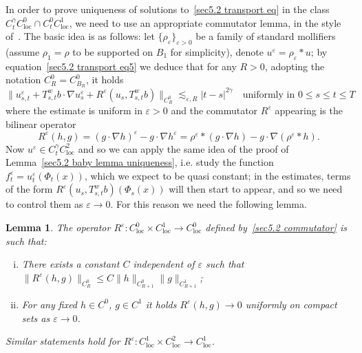 \documentclass[10pt]{article}
\newcommand{\tmop}[1]{\ensuremath{\operatorname{#1}}}
\newenvironment{enumerateroman}{\begin{enumerate}[i.] }{\end{enumerate}}
\newtheorem{lemma}{Lemma}
\begin{document}
In order to prove uniqueness of solutions to~{\eqref{sec5.2 transport eq}} in
the class $C^{\gamma}_t C^0_{\tmop{loc}} \cap C^0_t C^1_{\tmop{loc}}$, we need
to use an appropriate commutator lemma, in the style of~{\cite{diperna}}. The
basic idea is as follows: let $\{ \rho_{\varepsilon} \}_{\varepsilon > 0}$ be
a family of standard mollifiers (assume $\rho^{}_1 = \rho$ to be supported on
$B_1$ for simplicity), denote $u^{\varepsilon} = \rho_{\varepsilon} \ast u$;
by equation~{\eqref{sec5.2 transport eq5}} we deduce that for any $R > 0$,
adopting the notation $C^0_R = C^0_{B_R}$, it holds
\[ \| u^{\varepsilon}_{s, t} + T^w_{s, t} b \cdot \nabla u^{\varepsilon}_s +
   R^{\varepsilon} (u_s, T^w_{s, t} b) \|_{C^0_R} \lesssim_{\varepsilon, R} |
   t - s |^{2 \gamma} \quad \text{uniformly in } 0 \leqslant s \leqslant t
   \leqslant T \]
where the estimate is uniform in $\varepsilon > 0$ and the commutator
$R^{\varepsilon}$ appearing is the bilinear operator
\begin{equation}
  R^{\varepsilon} (h, g) = (g \cdot \nabla h)^{\varepsilon} - g \cdot \nabla
  h^{\varepsilon} = \rho^{\varepsilon} \ast (g \cdot \nabla h) - g \cdot
  \nabla (\rho^{\varepsilon} \ast h) . \label{sec5.2 commutator}
\end{equation}
Now $u^{\varepsilon} \in C^{\gamma}_t C^2_{\tmop{loc}}$ and so we can apply
the same idea of the proof of Lemma~\ref{sec5.2 baby lemma uniqueness}, i.e.
study the function $f^{\varepsilon}_t = u^{\varepsilon}_t (\Phi_t (x))$, which
we expect to be quasi constant; in the estimates, terms of the form
$R^{\varepsilon} (u_s, T^w_{s, t} b) (\Phi_s (x))$ will then start to appear,
and so we need to control them as $\varepsilon \rightarrow 0$. For this reason
we need the following lemma.

\begin{lemma}
  \label{sec5.2 lemma baby commutator}The operator $R^{\varepsilon} :
  C_{\tmop{loc}}^0 \times C_{\tmop{loc}}^1 \rightarrow C_{\tmop{loc}}^0$
  defined by~{\eqref{sec5.2 commutator}} is such that:
  \begin{enumerateroman}
    \item There exists a constant $C$ independent of $\varepsilon$ such that
    $\| R^{\varepsilon} (h, g) \|_{C^0_R} \leqslant C \| h \|_{C_{R + 1}^0} \|
    g \|_{C_{R + 1}^1}$;
    
    \item For any fixed $h \in C^0$, $g \in C^1$ it holds $R^{\varepsilon} (h,
    g) \rightarrow 0$ uniformly on compact sets as $\varepsilon \rightarrow
    0$.
  \end{enumerateroman}
  Similar statements hold for $R^{\varepsilon} : C_{\tmop{loc}}^1 \times
  C_{\tmop{loc}}^2 \rightarrow C_{\tmop{loc}}^1$.
\end{lemma}
\end{document}
